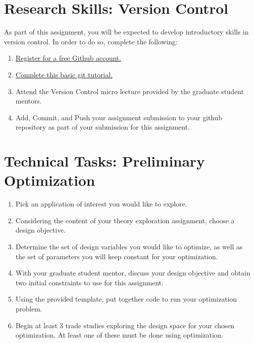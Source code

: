 \documentclass[11pt]{article}
\begin{document}
	
	

\section{Research Skills: Version Control}

As part of this assignment, you will be expected to develop introductory skills in version control.
In order to do so, complete the following:
\begin{enumerate}[label=\alph*.]
	\item \href{https://github.com/}{Register for a free Github account.}
	\item  \href{https://docs.github.com/en/get-started/quickstart/hello-world}{Complete this basic git tutorial.}
	\item Attend the Version Control micro lecture provided by the graduate student mentors.
	\item Add, Commit, and Push your assignment submission to your github repository as part of your submission for this assignment.
\end{enumerate}
	
	
	
	

\section{Technical Tasks: Preliminary Optimization}

\begin{enumerate}[label=\alph*.]
    \item Pick an application of interest you would like to explore.
    \item Considering the content of your theory exploration assignment, choose a design objective.
    \item Determine the set of design variables you would like to optimize, as well as the set of parameters you will keep constant for your optimization.
    \item With your graduate student mentor, discuss your design objective and obtain two initial constraints to use for this assignment.
    \item Using the provided template, put together code to run your optimization problem. 
   	\item Begin at least 3 trade studies exploring the design space for your chosen optimization.  At least one of these must be done using optimization.
\end{enumerate}
	
\end{document}
